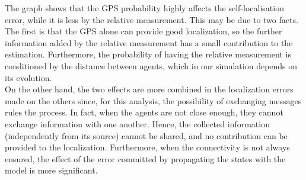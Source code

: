 The graph shows that the GPS probability highly affects the self-localisation error, while it is less by the relative measurement. This may be due to two facts. The first is that the GPS alone can provide good localization, so the further information added by the relative measurement has a small contribution to the estimation. Furthermore, the probability of having the relative measurement is conditioned by the distance between agents, which in our simulation depends on its evolution.\\
On the other hand, the two effects are more combined in the localization errors made on the others since, for this analysis, the possibility of exchanging messages rules the process. In fact, when the agents are not close enough, they cannot exchange information with one another. Hence, the collected information (independently from its source) cannot be shared, and no contribution can be provided to the localization. Furthermore, when the connectivity is not always ensured, the effect of the error committed by propagating the states with the model is more significant.
